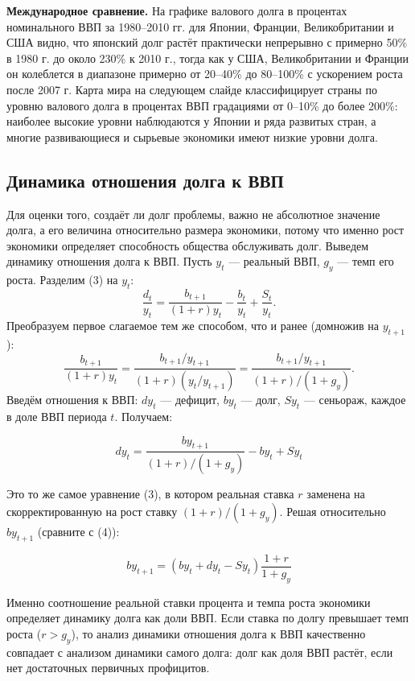 \documentclass[11pt,a4paper]{article}
\begin{document}
\textbf{Международное сравнение.} На графике валового долга в процентах номинального ВВП за 1980--2010 гг. для Японии, Франции, Великобритании и США видно, что японский долг растёт практически непрерывно с примерно 50\% в 1980 г. до около 230\% к 2010 г., тогда как у США, Великобритании и Франции он колеблется в диапазоне примерно от 20--40\% до 80--100\% с ускорением роста после 2007 г. Карта мира на следующем слайде классифицирует страны по уровню валового долга в процентах ВВП градациями от 0--10\% до более 200\%: наиболее высокие уровни наблюдаются у Японии и ряда развитых стран, а многие развивающиеся и сырьевые экономики имеют низкие уровни долга.

\subsection{Динамика отношения долга к ВВП}

Для оценки того, создаёт ли долг проблемы, важно не абсолютное значение долга, а его величина относительно размера экономики, потому что именно рост экономики определяет способность общества обслуживать долг. Выведем динамику отношения долга к ВВП. Пусть $y_t$ --- реальный ВВП, $g_y$ --- темп его роста. Разделим (3) на $y_t$:
$$\frac{d_t}{y_t}=\frac{b_{t+1}}{(1+r)y_t}-\frac{b_t}{y_t}+\frac{S_t}{y_t}.$$
Преобразуем первое слагаемое тем же способом, что и ранее (домножив на $y_{t+1}$):
$$\frac{b_{t+1}}{(1+r)y_t}=\frac{b_{t+1}/y_{t+1}}{(1+r)(y_t/y_{t+1})}=\frac{b_{t+1}/y_{t+1}}{(1+r)/(1+g_y)}.$$
Введём отношения к ВВП: $dy_t$ --- дефицит, $by_t$ --- долг, $Sy_t$ --- сеньораж, каждое в доле ВВП периода $t$. Получаем:
\begin{formulabox}
\begin{equation}
dy_t=\frac{by_{t+1}}{(1+r)/(1+g_y)}-by_t+Sy_t \tag{9}
\end{equation}
\end{formulabox}
Это то же самое уравнение (3), в котором реальная ставка $r$ заменена на скорректированную на рост ставку $(1+r)/(1+g_y)$. Решая относительно $by_{t+1}$ (сравните с (4)):
\begin{formulabox}
\begin{equation}
by_{t+1}=(by_t+dy_t-Sy_t)\frac{1+r}{1+g_y}
\end{equation}
\end{formulabox}
Именно соотношение реальной ставки процента и темпа роста экономики определяет динамику долга как доли ВВП. Если ставка по долгу превышает темп роста ($r>g_y$), то анализ динамики отношения долга к ВВП качественно совпадает с анализом динамики самого долга: долг как доля ВВП растёт, если нет достаточных первичных профицитов.
\end{document}

